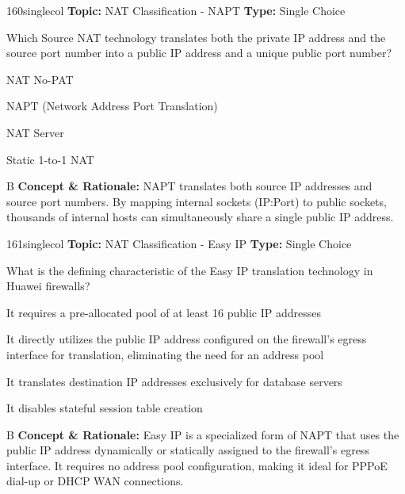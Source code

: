 \begin{qcard}{160}{singlecol}
\textcolor{darkslate!75}{\small\textbf{Topic:} NAT Classification - NAPT \hfill \textbf{Type:} Single Choice}\vspace{0.4em}\par
Which Source NAT technology translates both the private IP address and the source port number into a public IP address and a unique public port number?
\begin{qoptions}
\item NAT No-PAT
\item NAPT (Network Address Port Translation)
\item NAT Server
\item Static 1-to-1 NAT
\end{qoptions}
\end{qcard}
\nopagebreak
\begin{explainbox}{B}
\textbf{Concept \& Rationale:} NAPT translates both source IP addresses and source port numbers. By mapping internal sockets (IP:Port) to public sockets, thousands of internal hosts can simultaneously share a single public IP address.
\end{explainbox}

\begin{qcard}{161}{singlecol}
\textcolor{darkslate!75}{\small\textbf{Topic:} NAT Classification - Easy IP \hfill \textbf{Type:} Single Choice}\vspace{0.4em}\par
What is the defining characteristic of the Easy IP translation technology in Huawei firewalls?
\begin{qoptions}
\item It requires a pre-allocated pool of at least 16 public IP addresses
\item It directly utilizes the public IP address configured on the firewall's egress interface for translation, eliminating the need for an address pool
\item It translates destination IP addresses exclusively for database servers
\item It disables stateful session table creation
\end{qoptions}
\end{qcard}
\nopagebreak
\begin{explainbox}{B}
\textbf{Concept \& Rationale:} Easy IP is a specialized form of NAPT that uses the public IP address dynamically or statically assigned to the firewall's egress interface. It requires no address pool configuration, making it ideal for PPPoE dial-up or DHCP WAN connections.
\end{explainbox}

